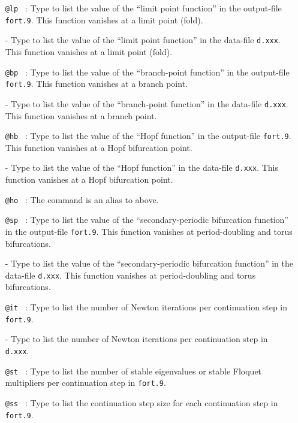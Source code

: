 \documentclass[12pt]{report}
\begin{document}
\begin{itemize}
\item[\tt @lp]~:
  Type  to list the value of the ``limit point function'' 
  in the output-file {\tt fort.9}. This function
  vanishes at a limit point (fold).
  \item[-]
  Type  to list the value of the ``limit point function'' 
  in the data-file {\tt d.xxx}. This function
  vanishes at a limit point (fold).
\item[\tt @bp]~:
  Type  to list the value of the ``branch-point function'' 
  in the output-file {\tt fort.9}. This function
  vanishes at a branch point.
  \item[-]
  Type  to list the value of the ``branch-point function''
  in the data-file {\tt d.xxx}. This function
  vanishes at a branch point.
\item[\tt @hb]~:
  Type  to list the value of the ``Hopf function'' 
  in the output-file {\tt fort.9}. This function
  vanishes at a Hopf bifurcation point.
  \item[-]
  Type  to list the value of the ``Hopf function''
  in the data-file {\tt d.xxx}. This function
  vanishes at a  Hopf bifurcation point.
\item[\tt @ho]~:
  The command  is an alias to  above.
\item[\tt @sp]~:
  Type  to list the value of the 
  ``secondary-periodic bifurcation function'' 
  in the output-file {\tt fort.9}. This function
  vanishes at period-doubling and torus bifurcations.
  \item[-]
  Type  to list the value of the
   ``secondary-periodic bifurcation function''
  in the data-file {\tt d.xxx}. This function
  vanishes at period-doubling and torus bifurcations.
\item[\tt @it]~:
  Type  to list the number of Newton iterations per
  continuation step in {\tt fort.9}. 
  \item[-]
   Type  to list the number of Newton iterations per
  continuation step in {\tt d.xxx}. 
\item[\tt @st]~:
  Type  to list the number of stable eigenvalues or stable
  Floquet multipliers per continuation step in  {\tt fort.9}. 
\item[\tt @ss]~:
  Type  to list the continuation step size for each
  continuation step in  {\tt fort.9}. 

\end{itemize}
\end{document}
